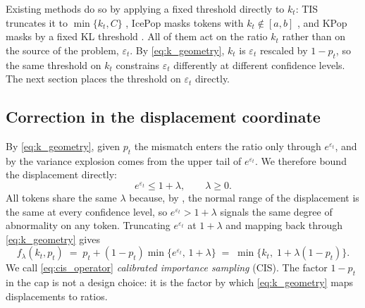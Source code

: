 Existing methods do so by applying a fixed threshold directly to $k_t$: TIS
truncates it to $\min\{k_t,C\}$ \citep{cite}, IcePop masks tokens with
$k_t\notin[a,b]$ \citep{cite}, and KPop masks by a fixed KL threshold
\citep{cite}. All of them act on the ratio $k_t$ rather than on the source of
the problem, $\varepsilon_t$. By \eqref{eq:k_geometry}, $k_t$ is
$\varepsilon_t$ rescaled by $1-p_t$, so the same threshold on $k_t$ constrains
$\varepsilon_t$ differently at different confidence levels. The next section
places the threshold on $\varepsilon_t$ directly.
\subsection{Correction in the displacement coordinate}
\label{sec:optimal_operator}

By \eqref{eq:k_geometry}, given $p_t$ the mismatch enters the ratio only through
$e^{\varepsilon_t}$, and by  the variance explosion
comes from the upper tail of $e^{\varepsilon_t}$. We therefore bound the
displacement directly:
\begin{equation}
e^{\varepsilon_t}\le1+\lambda,\qquad \lambda\ge0 .
\label{eq:disp_threshold}
\end{equation}
All tokens share the same $\lambda$ because, by ,
the normal range of the displacement is the same at every confidence level, so
$e^{\varepsilon_t}>1+\lambda$ signals the same degree of abnormality on any
token. Truncating $e^{\varepsilon_t}$ at $1+\lambda$ and mapping back through
\eqref{eq:k_geometry} gives
\begin{equation}
f_{\lambda}(k_t,p_t)
\;=\;
p_t+(1-p_t)\min\big\{e^{\varepsilon_t},\,1+\lambda\big\}
\;=\;
\min\big\{k_t,\;1+\lambda(1-p_t)\big\}.
\label{eq:cis_operator}
\end{equation}
We call \eqref{eq:cis_operator} \emph{calibrated importance sampling} (CIS).
The factor $1-p_t$ in the cap is not a design choice: it is the factor by which
\eqref{eq:k_geometry} maps displacements to ratios.

